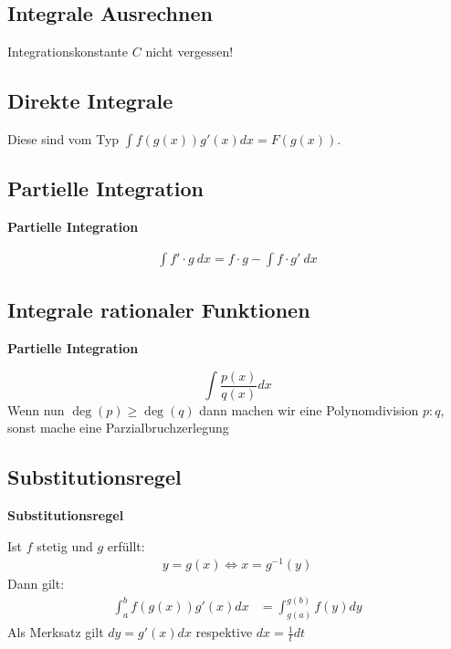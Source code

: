 \documentclass[25pt]{sciposter}
\newenvironment{method}[1]{\begin{mdframed}[backgroundcolor=blue!10,innertopmargin=15pt, innerbottommargin=15pt,nobreak=true]
		\textbf{#1 }
	}
	{ 
	\end{mdframed}
}
\newenvironment{important}{\begin{mdframed}[backgroundcolor=red!50,innertopmargin=15pt, innerbottommargin=15pt, nobreak=true]
		\Large
	}
	{ 
	\end{mdframed}
}
\begin{document}
\begin{multicols}{3}
\section*{Integrale Ausrechnen}

\begin{important}
Integrationskonstante $C$ nicht vergessen!
\end{important}

\subsection*{Direkte Integrale}
Diese sind vom Typ $\int f(g(x)) g'(x) dx = F(g(x))$.

\subsection*{Partielle Integration}
\begin{method}{Partielle Integration}
\begin{align*}
	\int f' \cdot g \ dx = f \cdot g - \int f \cdot g' \  dx
\end{align*}
\end{method}



\subsection*{Integrale rationaler Funktionen}
\begin{method}{Partielle Integration}
	$$\int \frac{p(x)}{q(x)} dx$$
	Wenn nun $\deg(p) \geq \deg(q)$ dann machen wir eine Polynomdivision $p:q$, sonst mache eine Parzialbruchzerlegung
\end{method}

\subsection*{Substitutionsregel}
\begin{method}{Substitutionsregel}
Ist $f$ stetig und $g$ erfüllt:
\begin{align*}
	y = g(x) \iff x = g^{-1}(y)
\end{align*}
Dann gilt:
\begin{align*}
\int_a ^b f(g(x))g'(x) dx &= \int_{g(a)}^{g(b)} f(y) dy
\end{align*}
Als Merksatz gilt $dy = g'(x) dx$ respektive $dx = \frac{1}{t} dt$
\end{method}


\end{multicols}
\end{document}
